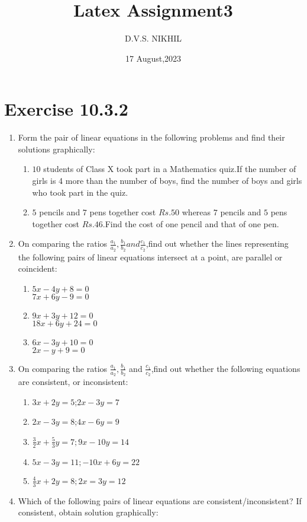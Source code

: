 \documentclass{article}
\theoremstyle{remark}
\begin{document}
\title{Latex Assignment3}
\author{D.V.S. NIKHIL}
\date{17 August,2023}
\maketitle
\section*{Exercise 10.3.2}
\begin{enumerate}
\item Form the pair of linear equations in the following problems and find their solutions graphically:
\begin{enumerate}[label=(\roman*)]
\item $10$ students of Class X took part in a Mathematics quiz.If the number of girls is 4 more than the number of boys, find the number of boys and girls who took part in the quiz.
\item $5$ pencils and $7$ pens together cost $Rs.50$ whereas $7$ pencils and $5$ pens together cost $Rs.46$.Find the cost of one pencil and that of one pen.
\end{enumerate}
\item On comparing the ratios $\frac{a_{1}}{a_2},\frac{b_1}{b_2} and \frac{c_1}{c_2}$,find out whether the lines representing the following pairs of linear equations intersect at a point, are parallel or coincident:
\begin{enumerate}[label=(\roman*)]
\item $5x-4y+8=0$\\ $7x+6y-9=0$
\item $9x+3y+12=0$\\ $18x+6y+24=0$
\item $6x-3y+10=0$\\ $2x-y+9=0$
\end{enumerate}
\item On comparing the ratios $\frac{a_1}{a_2},\frac{b_1}{b_2}$ and $\frac {c_1}{c_2}$,find out whether the following equations are consistent, or inconsistent:
\begin{enumerate}[label=(\roman*)]
\item $3x+2y=5$;$2x-3y=7$
\item $2x-3y=8$;$4x-6y=9$
\item $\frac{3}{2}x+\frac{5}{3}y=7;9x-10y=14$
\item $5x-3y=11;-10x+6y=22$
\item$\frac{4}{3}x+2y=8;2x=3y=12$
\end{enumerate}
\item Which of the following pairs of linear equations are consistent/inconsistent? If consistent, obtain solution graphically:

\end{enumerate}
\end{document}
